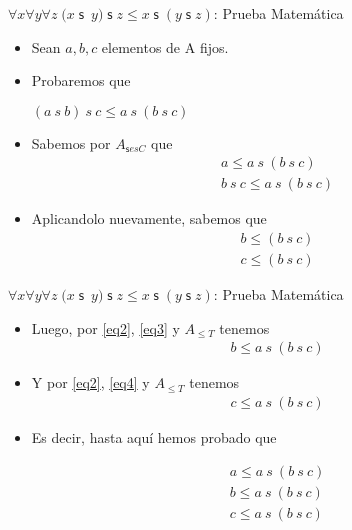 \documentclass[10pt]{beamer}
\newcommand{\Ntrans}{{A}_{\leq T}}
\newcommand{\NsCot}{{A}_{\mathsf{s}esC}}
\newcommand{\assoc}{\forall x\forall y\forall
z\;(x\;\mathsf{s}$\ $y)\;\mathsf{s}\;z\leq x\;\mathsf{s}\;(y\;\mathsf{s}\;z)}
\begin{document}
\begin{frame}{$\assoc$: Prueba Matemática}
  \begin{itemize}[<+->]

    \item Sean $a, b, c$ elementos de A fijos.
    \item Probaremos que
      \begin{center}
        $ (a\ s\ b)\ s\ c  \leq a\ s\ (b\ s\ c) $
      \end{center}
    \item Sabemos por $\NsCot$ que
      \begin{align}
        &a \leq a\ s\ (b\ s\ c) \label{eq1} \\
        &b\ s\ c \leq a\ s\ (b\ s\ c) \label{eq2}
      \end{align}
    \item Aplicandolo nuevamente, sabemos que
      \begin{align}
        &b \leq (b\ s\ c) \label{eq3}\\
        &c \leq (b\ s\ c) \label{eq4}
      \end{align}

  \end{itemize}

\end{frame}

\begin{frame}{$\assoc$: Prueba Matemática}
  \begin{itemize}[<+->]

    \item Luego, por \eqref{eq2}, \eqref{eq3} y $\Ntrans$ tenemos
      \begin{align}
        &b \leq a\ s\ (b\ s\ c) \label{eq5}
      \end{align}

    \item Y por \eqref{eq2}, \eqref{eq4} y $\Ntrans$ tenemos
    \begin{align}
      &c \leq a\ s\ (b\ s\ c) \label{eq6}
    \end{align}

    \item Es decir, hasta aquí hemos probado que

      \begin{align}
        &a \leq a\ s\ (b\ s\ c) \label{eq1} \\
        &b \leq a\ s\ (b\ s\ c) \label{eq5} \\
        &c \leq a\ s\ (b\ s\ c) \label{eq6}
      \end{align}

  \end{itemize}
\end{frame}
\end{document}
